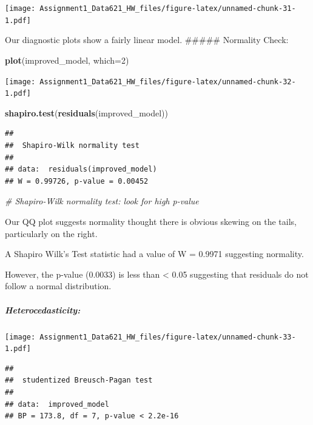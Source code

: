 \documentclass[
]{article}
\newenvironment{Shaded}{\begin{snugshade}}{\end{snugshade}}
\newcommand{\AttributeTok}[1]{\textcolor[rgb]{0.13,0.29,0.53}{#1}}
\newcommand{\CommentTok}[1]{\textcolor[rgb]{0.56,0.35,0.01}{\textit{#1}}}
\newcommand{\DecValTok}[1]{\textcolor[rgb]{0.00,0.00,0.81}{#1}}
\newcommand{\FunctionTok}[1]{\textcolor[rgb]{0.13,0.29,0.53}{\textbf{#1}}}
\newcommand{\NormalTok}[1]{#1}
\begin{document}
\texttt{[image: Assignment1\_Data621\_HW\_files/figure-latex/unnamed-chunk-31-1.pdf]}

Our diagnostic plots show a fairly linear model. \#\#\#\#\# Normality
Check:

\begin{Shaded}
\begin{Highlighting}[]
\FunctionTok{plot}\NormalTok{(improved\_model, }\AttributeTok{which=}\DecValTok{2}\NormalTok{)}
\end{Highlighting}
\end{Shaded}

\texttt{[image: Assignment1\_Data621\_HW\_files/figure-latex/unnamed-chunk-32-1.pdf]}

\begin{Shaded}
\begin{Highlighting}[]
\FunctionTok{shapiro.test}\NormalTok{(}\FunctionTok{residuals}\NormalTok{(improved\_model))}
\end{Highlighting}
\end{Shaded}

\begin{verbatim}
## 
##  Shapiro-Wilk normality test
## 
## data:  residuals(improved_model)
## W = 0.99726, p-value = 0.00452
\end{verbatim}

\begin{Shaded}
\begin{Highlighting}[]
\CommentTok{\# Shapiro{-}Wilk normality test: look for high p{-}value}
\end{Highlighting}
\end{Shaded}

Our QQ plot suggests normality thought there is obvious skewing on the
tails, particularly on the right.

A Shapiro Wilk's Test statistic had a value of W = 0.9971 suggesting
normality.

However, the p-value (0.0033) is less than \textless{} 0.05 suggesting
that residuals do not follow a normal distribution.

\subparagraph{Heterocedasticity:}\label{heterocedasticity-1}

\texttt{[image: Assignment1\_Data621\_HW\_files/figure-latex/unnamed-chunk-33-1.pdf]}

\begin{verbatim}
## 
##  studentized Breusch-Pagan test
## 
## data:  improved_model
## BP = 173.8, df = 7, p-value < 2.2e-16
\end{verbatim}
\end{document}
